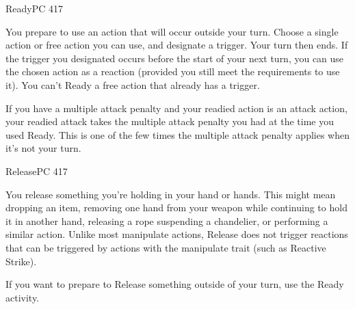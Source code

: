 \documentclass[12pt,openany,twocolumn]{book}
\begin{document}
\begin{action}{Ready}{}{PC 417}
    \begin{actioninfo}
    \end{actioninfo}

    \begin{actionbody}
        You prepare to use an action that will occur outside your turn. Choose a single action or free action you can use, and designate a trigger. Your turn then ends. If the trigger you designated occurs before the start of your next turn, you can use the chosen action as a reaction (provided you still meet the requirements to use it). You can't Ready a free action that already has a trigger.

        If you have a multiple attack penalty and your readied action is an attack action, your readied attack takes the multiple attack penalty you had at the time you used Ready. This is one of the few times the multiple attack penalty applies when it's not your turn.
    \end{actionbody}
\end{action}

\begin{action}{Release}{\freeaction{}}{PC 417}
    \begin{actioninfo}
    \end{actioninfo}

    \begin{actionbody}
        You release something you're holding in your hand or hands. This might mean dropping an item, removing one hand from your weapon while continuing to hold it in another hand, releasing a rope suspending a chandelier, or performing a similar action. Unlike most manipulate actions, Release does not trigger reactions that can be triggered by actions with the manipulate trait (such as Reactive Strike).

        If you want to prepare to Release something outside of your turn, use the Ready activity.
    \end{actionbody}
\end{action}
\end{document}
